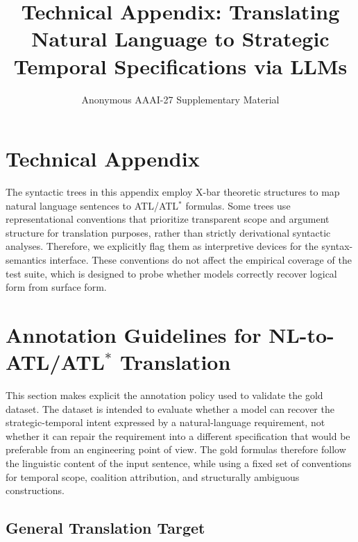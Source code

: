 \documentclass[letterpaper]{article}
\begin{document}
\title{Technical Appendix: Translating Natural Language to Strategic Temporal Specifications via LLMs}
\author{Anonymous AAAI-27 Supplementary Material}
\affiliations{}
\maketitle

\appendix
\section{Technical Appendix}

The syntactic trees in this appendix employ X-bar theoretic structures to map natural language sentences to ATL/ATL$^\ast$ formulas. Some trees use representational conventions that prioritize transparent scope and argument structure for translation purposes, rather than strictly derivational syntactic analyses. Therefore, we explicitly flag them as interpretive devices for the syntax-semantics interface. These conventions do not affect the empirical coverage of the test suite, which is designed to probe whether models correctly recover logical form from surface form.


\section{Annotation Guidelines for NL-to-ATL/ATL$^\ast$ Translation}
\label{sec:annotation-guidelines}

This section makes explicit the annotation policy used to validate the gold dataset. The dataset is intended to evaluate whether a model can recover the strategic-temporal intent expressed by a natural-language requirement, not whether it can repair the requirement into a different specification that would be preferable from an engineering point of view. The gold formulas therefore follow the linguistic content of the input sentence, while using a fixed set of conventions for temporal scope, coalition attribution, and structurally ambiguous constructions.

\subsection{General Translation Target}
\end{document}
